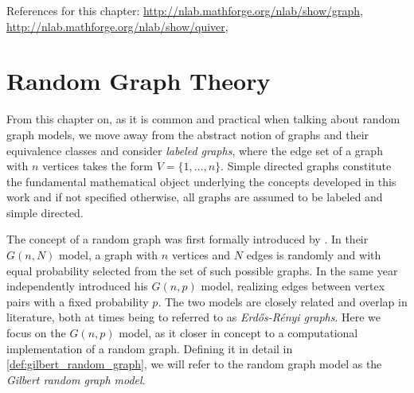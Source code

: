 References for this chapter:
\url{http://nlab.mathforge.org/nlab/show/graph},
\url{http://nlab.mathforge.org/nlab/show/quiver}, \parencite{Bang-Jensen_Digraphs}










\section{Random Graph Theory}\label{sec:random_graph_theory}


From this chapter on, as it is common and practical when talking about
random graph models, we move away from the abstract notion
of graphs and their equivalence classes and consider \textit{labeled
  graphs}, where the edge set of a graph with $n$ vertices takes the
form $V = \{1,\ldots,n\}$. Simple directed graphs constitute the
fundamental mathematical object underlying the concepts developed in
this work and if not specified otherwise, all graphs are assumed to be
labeled and simple directed.

The concept of a random graph was first formally introduced by
\textcite{Erdos1959}. In their $G(n,N)$ model, a graph with $n$
vertices and $N$ edges is randomly and with equal probability selected
from the set of such possible graphs. In the same year
\textcite{Gilbert1959} independently introduced his $G(n,p)$ model,
realizing edges between vertex pairs with a fixed probability $p$. The
two models are closely related \parencite{Luczak1990} and overlap in
literature, both at times being to referred to as
\textit{Erd\H{o}s-R\'{e}nyi graphs}. Here we focus on the $G(n,p)$
model, as it closer in concept to a computational implementation of a
random graph. Defining it in detail in \ref{def:gilbert_random_graph},
we will refer to the random graph model as the \textit{Gilbert random
  graph model}.

